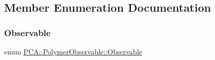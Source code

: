 \subsection{Member Enumeration Documentation}
\hypertarget{class_p_c_a_1_1_polymer_observable_a6dcabbc3bc249018c2c94825bff2c94f}{}\label{class_p_c_a_1_1_polymer_observable_a6dcabbc3bc249018c2c94825bff2c94f} 
\subsubsection{\texorpdfstring{Observable}{Observable}}
{\footnotesize\ttfamily enum \hyperlink{class_p_c_a_1_1_polymer_observable_a6dcabbc3bc249018c2c94825bff2c94f}{P\+C\+A\+::\+Polymer\+Observable\+::\+Observable}}

